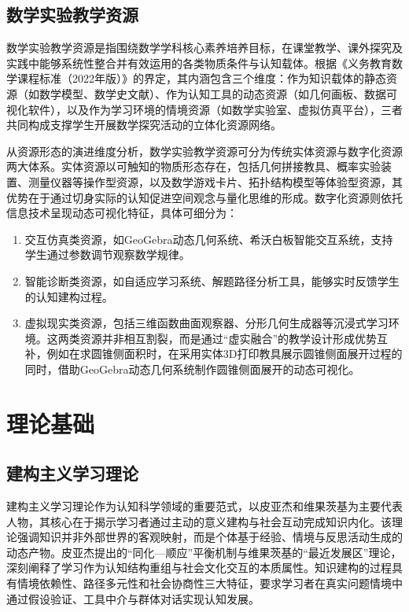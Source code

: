 \subsection{数学实验教学资源}

数学实验教学资源是指围绕数学学科核心素养培养目标，在课堂教学、课外探究及实践中能够系统性整合并有效运用的各类物质条件与认知载体。根据《义务教育数学课程标准（2022年版）》的界定，其内涵包含三个维度：作为知识载体的静态资源（如数学模型、数学史文献）、作为认知工具的动态资源（如几何画板、数据可视化软件），以及作为学习环境的情境资源（如数学实验室、虚拟仿真平台）\cite{2022_中华人民共和国教育部_义务教育数学课程标准}，三者共同构成支撑学生开展数学探究活动的立体化资源网络。

从资源形态的演进维度分析，数学实验教学资源可分为传统实体资源与数字化资源两大体系。实体资源以可触知的物质形态存在，包括几何拼接教具、概率实验装置、测量仪器等操作型资源，以及数学游戏卡片、拓扑结构模型等体验型资源，其优势在于通过切身实际的认知促进空间观念与量化思维的形成。数字化资源则依托信息技术呈现动态可视化特征，具体可细分为：
\begin{enumerate}[(1)]
  \item 交互仿真类资源，如GeoGebra动态几何系统、希沃白板智能交互系统，支持学生通过参数调节观察数学规律。
  \item 智能诊断类资源，如自适应学习系统、解题路径分析工具，能够实时反馈学生的认知建构过程。
  \item 虚拟现实类资源，包括三维函数曲面观察器、分形几何生成器等沉浸式学习环境。这两类资源并非相互割裂，而是通过“虚实融合”的教学设计形成优势互补，例如在求圆锥侧面积时，在采用实体3D打印教具展示圆锥侧面展开过程的同时，借助GeoGebra动态几何系统制作圆锥侧面展开的动态可视化。
\end{enumerate}


\section{理论基础}
\subsection{建构主义学习理论}
建构主义学习理论作为认知科学领域的重要范式，以皮亚杰和维果茨基为主要代表人物，其核心在于揭示学习者通过主动的意义建构与社会互动完成知识内化。该理论强调知识并非外部世界的客观映射，而是个体基于经验、情境与反思活动生成的动态产物。皮亚杰提出的“同化—顺应”平衡机制与维果茨基的“最近发展区”理论，深刻阐释了学习作为认知结构重组与社会文化交互的本质属性\cite{2008_高文_建构主义教育研究}。知识建构的过程具有情境依赖性、路径多元性和社会协商性三大特征，要求学习者在真实问题情境中通过假设验证、工具中介与群体对话实现认知发展。

